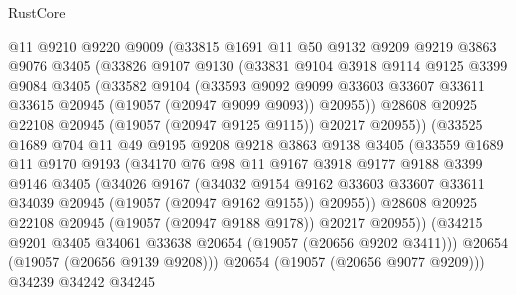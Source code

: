 \begin{lexlean}{RustCore}
\begin{coremodule}
            @11
            @9210
            @9220
            @9009
            (@33815
              @1691
              @11
              @50
              @9132
              @9209
              @9219
              @3863
              @9076
              @3405
              (@33826
                @9107
                @9130
                (@33831
                  @9104
                  @3918
                  @9114
                  @9125
                  @3399
                  @9084
                  @3405
                  (@33582
                    @9104
                    (@33593
                      @9092
                      @9099
                      @33603
                      @33607
                      @33611
                      @33615
                      @20945
                      (@19057 (@20947 @9099 @9093))
                      @20955))
                  @28608
                  @20925
                  @22108
                  @20945
                  (@19057 (@20947 @9125 @9115))
                  @20217
                  @20955))
              (@33525
                @1689
                @704
                @11
                @49
                @9195
                @9208
                @9218
                @3863
                @9138
                @3405
                (@33559
                  @1689
                  @11
                  @9170
                  @9193
                  (@34170
                    @76
                    @98
                    @11
                    @9167
                    @3918
                    @9177
                    @9188
                    @3399
                    @9146
                    @3405
                    (@34026
                      @9167
                      (@34032
                        @9154
                        @9162
                        @33603
                        @33607
                        @33611
                        @34039
                        @20945
                        (@19057 (@20947 @9162 @9155))
                        @20955))
                    @28608
                    @20925
                    @22108
                    @20945
                    (@19057 (@20947 @9188 @9178))
                    @20217
                    @20955))
                (@34215 @9201 @3405 @34061 @33638 @20654 (@19057 (@20656 @9202 @3411)))
                @20654
                (@19057 (@20656 @9139 @9208)))
              @20654
              (@19057 (@20656 @9077 @9209)))
            @34239
            @34242
            @34245

\end{coremodule}
\end{lexlean}
